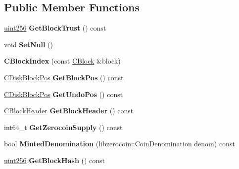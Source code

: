 \subsection*{Public Member Functions}
\begin{DoxyCompactItemize}
\item 
\mbox{\label{class_c_block_index_a59372ec3586ce89140acf3affc6e1f70}} 
\mbox{\hyperlink{classuint256}{uint256}} {\bfseries Get\+Block\+Trust} () const
\item 
\mbox{\label{class_c_block_index_a6139e9e2cfceaef3694631cb7c330ff0}} 
void {\bfseries Set\+Null} ()
\item 
\mbox{\label{class_c_block_index_a13df42495bcb07ed87e15efb5d43c324}} 
{\bfseries C\+Block\+Index} (const \mbox{\hyperlink{class_c_block}{C\+Block}} \&block)
\item 
\mbox{\label{class_c_block_index_ad0d95bf8524a1e94bc6cfb92adea0c63}} 
\mbox{\hyperlink{struct_c_disk_block_pos}{C\+Disk\+Block\+Pos}} {\bfseries Get\+Block\+Pos} () const
\item 
\mbox{\label{class_c_block_index_aa06679e5dd3f2425a1b667f6804b1a94}} 
\mbox{\hyperlink{struct_c_disk_block_pos}{C\+Disk\+Block\+Pos}} {\bfseries Get\+Undo\+Pos} () const
\item 
\mbox{\label{class_c_block_index_a29df6a3c3195ff87c650348a27959fa2}} 
\mbox{\hyperlink{class_c_block_header}{C\+Block\+Header}} {\bfseries Get\+Block\+Header} () const
\item 
\mbox{\label{class_c_block_index_ac164ec0f41e20b6f1fdce4ac5d4eadc4}} 
int64\+\_\+t {\bfseries Get\+Zerocoin\+Supply} () const
\item 
\mbox{\label{class_c_block_index_ae9fa684c1aa77f3c664389132d077f06}} 
bool {\bfseries Minted\+Denomination} (libzerocoin\+::\+Coin\+Denomination denom) const
\item 
\mbox{\label{class_c_block_index_a98490a2788c65cdd6ae9002b004dd74c}} 
\mbox{\hyperlink{classuint256}{uint256}} {\bfseries Get\+Block\+Hash} () const

\end{DoxyCompactItemize}
